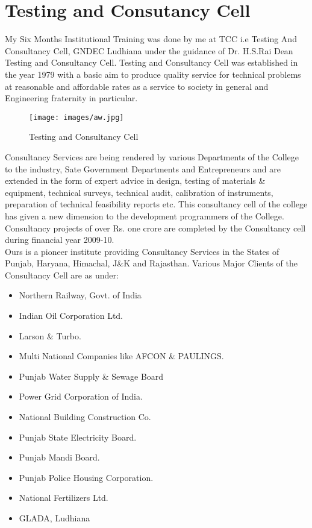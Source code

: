 \section{Testing and Consutancy Cell}

My Six Months Institutional Training was done by me at TCC i.e Testing And
Consultancy Cell,
GNDEC Ludhiana under the guidance of Dr. H.S.Rai Dean Testing and Consultancy Cell.
Testing and Consultancy Cell was established in the year 1979 with a basic aim to produce
quality service for technical problems at reasonable and affordable rates as a service to society
in general and Engineering fraternity in particular.\\
\begin{figure}[ht]
\centering
\texttt{[image: images/aw.jpg]}
\caption{Testing and Consultancy Cell}
\end{figure}
\hspace{-1.7em} 

Consultancy Services are being rendered by various Departments of the College to the
industry, Sate Government Departments and Entrepreneurs and are extended in the form of
expert advice in design, testing of materials \& equipment, technical surveys, technical audit,
calibration of instruments, preparation of technical feasibility reports etc.
This consultancy cell of the college has given a new dimension to the development
programmers of the College. Consultancy projects of over Rs. one crore are completed by the
Consultancy cell during financial year 2009-10. \\

Ours is a pioneer institute providing Consultancy Services in the States of Punjab, Haryana,
Himachal, J\&K and Rajasthan. Various Major Clients of the Consultancy Cell are as under:\\
\begin{itemize}
\item Northern Railway, Govt. of India
\item Indian Oil Corporation Ltd.
\item Larson \& Turbo.
\item Multi National Companies like AFCON \& PAULINGS.
\item Punjab Water Supply \& Sewage Board
\item Power Grid Corporation of India.
\item National Building Construction Co.
\item Punjab State Electricity Board.
\item Punjab Mandi Board.
\item Punjab Police Housing Corporation.
\item National Fertilizers Ltd.
\item GLADA, Ludhiana
\end{itemize}